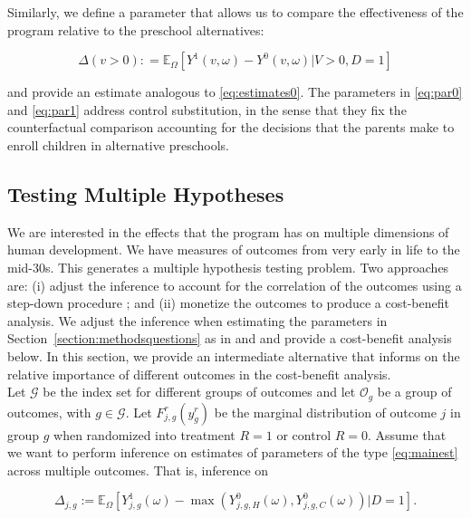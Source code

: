 \noindent Similarly, we define a parameter that allows us to compare the effectiveness of the program relative to the preschool alternatives: 

\begin{equation}
\Delta \left( v > 0 \right) : =   \mathbb{E}_{\Omega} \left[ Y^1 \left( v, \omega \right) - Y^0 \left( v, \omega \right) | V > 0, D = 1 \right] \label{eq:par1}
\end{equation}

\noindent and provide an estimate analogous to \eqref{eq:estimates0}. The parameters in \eqref{eq:par0} and \eqref{eq:par1} address control substitution, in the sense that they fix the counterfactual comparison accounting for the decisions that the parents make to enroll children in alternative preschools.

\subsection{Testing Multiple Hypotheses}  \label{section:counts}

\noindent We are interested in the effects that the program has on multiple dimensions of human development. We have measures of outcomes from very early in life to the mid-30s. This generates a multiple hypothesis testing problem. Two approaches are: (i) adjust the inference to account for the correlation of the outcomes using a step-down procedure \citep{Lehman_Romano_2005_AnnStat,Romano_Shaikh_2006_AnnStat}; and (ii) monetize the outcomes to produce a cost-benefit analysis. We adjust the inference when estimating the parameters in Section~\ref{section:methodsquestions} as in \citet{Lehman_Romano_2005_AnnStat} and \citet{Romano_Shaikh_2006_AnnStat} and provide a cost-benefit analysis below. In this section, we provide an intermediate alternative that informs on the relative importance of different outcomes in the cost-benefit analysis.\\

\noindent Let $\mathcal{G}$ be the index set for different groups of outcomes and let $\mathcal{O}_{g}$ be a group of outcomes, with $g \in \mathcal{G}$. Let $F_{j,g}^r \left( y_g^r\right) $ be the marginal distribution of outcome $j$ in group $g$ when randomized into treatment $R = 1$ or control $R = 0$. Assume that we want to perform inference on estimates of parameters of the type \eqref{eq:mainest} across multiple outcomes. That is, inference on 

\begin{equation}
\Delta_{j,g} := \mathbb{E}_{\Omega} \left[ Y_{j,g}^1 \left( \omega \right) -  \max \left(  Y_{j,g,H}^0 \left( \omega \right) ,  Y_{j,g,C}^0 \left( \omega \right)  \right) | D =1 \right]. 
\end{equation}

